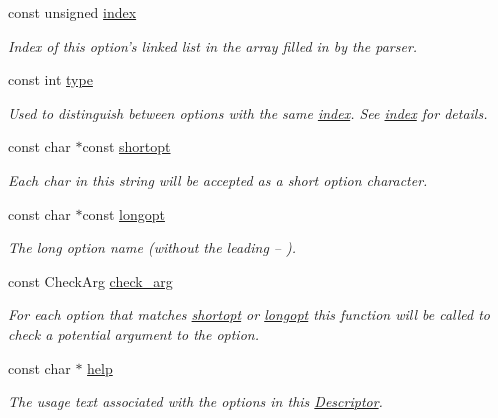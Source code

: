 \begin{DoxyCompactItemize}
\item 
const unsigned \hyperlink{structxmem_1_1config_1_1third__party_1_1_descriptor_aacf3d44f35c61f22be65da078f60734b}{index}
\begin{DoxyCompactList}\small\item\em Index of this option's linked list in the array filled in by the parser. \end{DoxyCompactList}\item 
const int \hyperlink{structxmem_1_1config_1_1third__party_1_1_descriptor_a4b9e9a5c9b08ef575ea4f603c54bff63}{type}
\begin{DoxyCompactList}\small\item\em Used to distinguish between options with the same \hyperlink{structxmem_1_1config_1_1third__party_1_1_descriptor_aacf3d44f35c61f22be65da078f60734b}{index}. See \hyperlink{structxmem_1_1config_1_1third__party_1_1_descriptor_aacf3d44f35c61f22be65da078f60734b}{index} for details. \end{DoxyCompactList}\item 
const char $\ast$const \hyperlink{structxmem_1_1config_1_1third__party_1_1_descriptor_ac2dfb6bb8ca2f4aabf964a910cf0d59b}{shortopt}
\begin{DoxyCompactList}\small\item\em Each char in this string will be accepted as a short option character. \end{DoxyCompactList}\item 
const char $\ast$const \hyperlink{structxmem_1_1config_1_1third__party_1_1_descriptor_a7246a4bfc669f68bb406dece398be7bb}{longopt}
\begin{DoxyCompactList}\small\item\em The long option name (without the leading {\ttfamily --} ). \end{DoxyCompactList}\item 
const Check\-Arg \hyperlink{structxmem_1_1config_1_1third__party_1_1_descriptor_a65b39f8d61de820bb5001d590e7dea5d}{check\-\_\-arg}
\begin{DoxyCompactList}\small\item\em For each option that matches \hyperlink{structxmem_1_1config_1_1third__party_1_1_descriptor_ac2dfb6bb8ca2f4aabf964a910cf0d59b}{shortopt} or \hyperlink{structxmem_1_1config_1_1third__party_1_1_descriptor_a7246a4bfc669f68bb406dece398be7bb}{longopt} this function will be called to check a potential argument to the option. \end{DoxyCompactList}\item 
const char $\ast$ \hyperlink{structxmem_1_1config_1_1third__party_1_1_descriptor_a099340907003981132a053856dac0eaa}{help}
\begin{DoxyCompactList}\small\item\em The usage text associated with the options in this \hyperlink{structxmem_1_1config_1_1third__party_1_1_descriptor}{Descriptor}. \end{DoxyCompactList}\end{DoxyCompactItemize}


